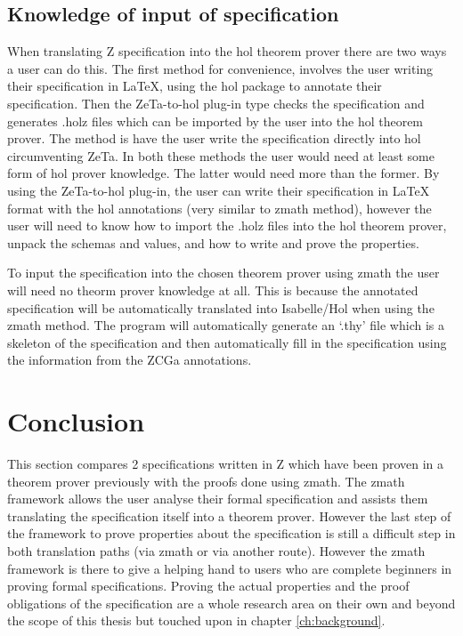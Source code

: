 \subsection{Knowledge of input of specification}
\label{knowledgeofinputforbb}

When translating Z specification into the \gls{hol} theorem prover there are two
ways a user can do this. The first method for convenience, involves the user
writing their specification in \LaTeX{}, using the \gls{hol} package to annotate
their specification. Then the ZeTa-to-\gls{hol} plug-in type checks the
specification and generates .holz files which can be imported by the user into
the \gls{hol} theorem prover. The method is have the user write the
specification directly into \gls{hol} circumventing ZeTa. In both these methods
the user would need at least some form of \gls{hol} prover knowledge. The latter
would need more than the former. By using the ZeTa-to-\gls{hol} plug-in, the
user can write their specification in \LaTeX{} format with the \gls{hol}
annotations (very similar to \gls{zmath} method), however the user will need to
know how to import the .holz files into the \gls{hol} theorem prover, unpack the
schemas and values, and how to write and prove the properties. 

To input the specification into the chosen theorem prover using \gls{zmath} the
user will need no theorm prover knowledge at all. This is because the annotated
specification will be automatically translated into Isabelle/Hol when using the
\gls{zmath} method. The program will automatically generate an `.thy' file which
is a skeleton of the specification and then automatically fill in the
specification using the information from the ZCGa annotations.

\section{Conclusion}
This section compares 2 specifications written in Z which have been proven in a
theorem prover previously with the proofs done using \gls{zmath}. The
\gls{zmath} framework allows the user analyse their formal specification and
assists them translating the specification itself into a theorem prover. However
the last step of the framework to prove properties about the specification is
still a difficult step in both translation paths (via \gls{zmath} or via another
route). However the \gls{zmath} framework is there to give a helping hand to
users who are complete beginners in proving formal specifications. Proving the
actual properties and the proof obligations of the specification are a whole
research area on their own and beyond the scope of this thesis but touched upon
in chapter \ref{ch:background}.

